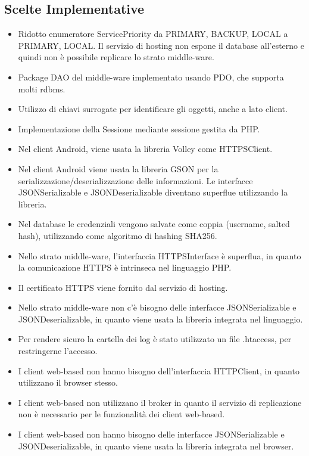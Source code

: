 \documentclass[a4paper]{article}
\begin{document}
\subsection{Scelte Implementative}

\begin{itemize}
    \item Ridotto enumeratore ServicePriority da PRIMARY, BACKUP, LOCAL a PRIMARY, LOCAL. Il servizio di hosting non espone il database all'esterno e quindi non è possibile replicare lo strato middle-ware.
    \item Package DAO del middle-ware implementato usando PDO, che supporta molti rdbms.
    \item Utilizzo di chiavi surrogate per identificare gli oggetti, anche a lato client.
    \item Implementazione della Sessione mediante sessione gestita da PHP.
    \item Nel client Android, viene usata la libreria Volley come HTTPSClient.
    \item Nel client Android viene usata la libreria GSON per la serializzazione/deserializzazione delle informazioni. Le interfacce JSONSerializable e JSONDeserializable diventano superflue utilizzando la libreria.
    \item Nel database le credenziali vengono salvate come coppia (username, salted hash), utilizzando come algoritmo di hashing SHA256.
    \item Nello strato middle-ware, l'interfaccia HTTPSInterface è superflua, in quanto la comunicazione HTTPS è intrinseca nel linguaggio PHP.
    \item Il certificato HTTPS viene fornito dal servizio di hosting.
    \item Nello strato middle-ware non c'è bisogno delle interfacce JSONSerializable e JSONDeserializable, in quanto viene usata la libreria integrata nel linguaggio.
    \item Per rendere sicuro la cartella dei log è stato utilizzato un file .htaccess, per restringerne l'accesso.
    \item I client web-based non hanno bisogno dell'interfaccia HTTPClient, in quanto utilizzano il browser stesso.
    \item I client web-based non utilizzano il broker in quanto il servizio di replicazione non è necessario per le funzionalità dei client web-based.
    \item I client web-based non hanno bisogno delle interfacce JSONSerializable e JSONDeserializable, in quanto viene usata la libreria integrata nel browser.

\end{itemize}
\end{document}
